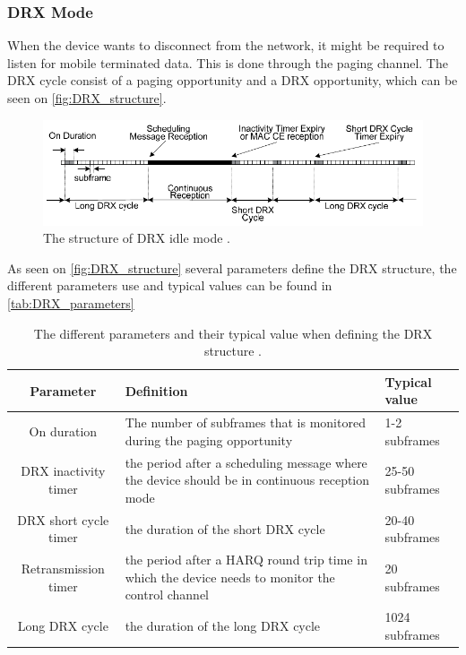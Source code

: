 \subsubsection{DRX Mode}
When the device wants to disconnect from the network, it might be required to listen for mobile terminated data. This is done through the paging channel. The DRX cycle consist of a paging opportunity and a DRX opportunity, which can be seen on \autoref{fig:DRX_structure}. 

\begin{figure}[H]
\centering
\includegraphics[width=\textwidth]{figures/DRX_structure.pdf}
\caption{The structure of \gls{DRX} idle mode \citep{book_LTE_for_UMTS2}.}
\label{fig:DRX_structure}
\end{figure}

As seen on \autoref{fig:DRX_structure} several parameters define the DRX structure, the different parameters use and typical values can be found in \autoref{tab:DRX_parameters}

\begin{table}[H]
\centering
\begin{tabular}{|c|p{6cm}|p{4cm}|} \hline
\textbf{Parameter} & \textbf{Definition} & \textbf{Typical value} \\ \hline 
On duration &  The number of subframes that is monitored during the paging opportunity & 1-2 subframes\\ \hline
DRX inactivity timer & the period after a scheduling message where the device should be in continuous reception mode & 25-50 subframes \\ \hline
DRX short cycle timer & the duration of the short DRX cycle & 20-40 subframes \\ \hline
Retransmission timer & the period after a \gls{HARQ} round trip time in which the device needs to monitor the control channel & 20  subframes \\ \hline
Long DRX cycle & the duration of the long DRX cycle & 1024 subframes \\ \hline
\end{tabular}
\caption{The different parameters and their typical value when defining the DRX structure \citep{book_LTE_for_UMTS}.}
\label{tab:DRX_parameters}
\end{table}

